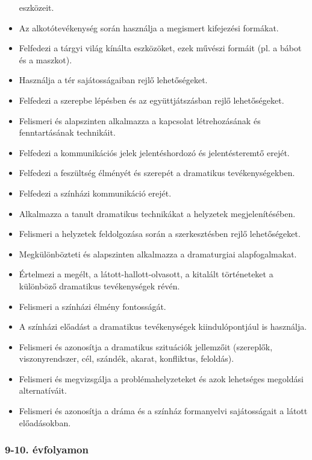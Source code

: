 \begin{itemize}
  eszközeit.
\item
  Az alkotótevékenység során használja a megismert kifejezési formákat.
\item
  Felfedezi a tárgyi világ kínálta eszközöket, ezek művészi formáit (pl.
  a bábot és a maszkot).
\item
  Használja a tér sajátosságaiban rejlő lehetőségeket.
\item
  Felfedezi a szerepbe lépésben és az együttjátszásban rejlő
  lehetőségeket.
\item
  Felismeri és alapszinten alkalmazza a kapcsolat létrehozásának és
  fenntartásának technikáit.
\item
  Felfedezi a kommunikációs jelek jelentéshordozó és jelentésteremtő
  erejét.
\item
  Felfedezi a feszültség élményét és szerepét a dramatikus
  tevékenységekben.
\item
  Felfedezi a színházi kommunikáció erejét.
\item
  Alkalmazza a tanult dramatikus technikákat a helyzetek
  megjelenítésében.
\item
  Felismeri a helyzetek feldolgozása során a szerkesztésben rejlő
  lehetőségeket.
\item
  Megkülönbözteti és alapszinten alkalmazza a dramaturgiai
  alapfogalmakat.
\item
  Értelmezi a megélt, a látott-hallott-olvasott, a kitalált történeteket
  a különböző dramatikus tevékenységek révén.
\item
  Felismeri a színházi élmény fontosságát.
\item
  A színházi előadást a dramatikus tevékenységek kiindulópontjául is
  használja.
\item
  Felismeri és azonosítja a dramatikus szituációk jellemzőit (szereplők,
  viszonyrendszer, cél, szándék, akarat, konfliktus, feloldás).
\item
  Felismeri és megvizsgálja a problémahelyzeteket és azok lehetséges
  megoldási alternatíváit.
\item
  Felismeri és azonosítja a dráma és a színház formanyelvi sajátosságait
  a látott előadásokban.
\end{itemize}

\hypertarget{evfolyamon-7}{%
\subsubsection{9-10. évfolyamon}\label{evfolyamon-7}}

